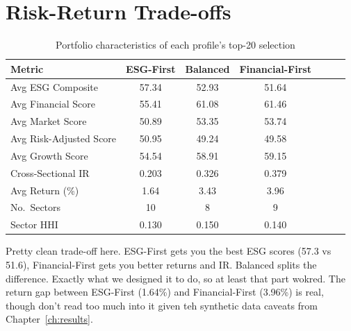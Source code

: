 \section{Risk-Return Trade-offs}\label{sec:profile_rr}
\begin{table}[!htbp]
\centering
\caption{Portfolio characteristics of each profile's top-20 selection}\label{tab:profile_chars}
\small
\begin{tabular}{@{}lcccccc@{}}
\toprule
\textbf{Metric} & \textbf{ESG-First} & \textbf{Balanced} & \textbf{Financial-First} \\
\midrule
Avg ESG Composite & 57.34 & 52.93 & 51.64 \\ Avg Financial Score & 55.41 & 61.08 & 61.46 \\ Avg Market Score & 50.89 & 53.35 & 53.74 \\ Avg Risk-Adjusted Score & 50.95 & 49.24 & 49.58 \\ Avg Growth Score & 54.54 & 58.91 & 59.15 \\ Cross-Sectional IR & 0.203 & 0.326 & 0.379 \\ Avg Return (\%) & 1.64 & 3.43 & 3.96 \\ No.\ Sectors & 10 & 8 & 9 \\ Sector HHI & 0.130 & 0.150 & 0.140 \\
\bottomrule
\end{tabular}
\end{table}
Pretty clean trade-off here. ESG-First gets you the best ESG scores (57.3 vs 51.6), Financial-First gets you better returns and IR. Balanced splits the difference. Exactly what we designed it to do, so at least that part wokred. The return gap between ESG-First (1.64\%) and Financial-First (3.96\%) is real, though don't read too much into it given teh synthetic data caveats from Chapter~\ref{ch:results}.
